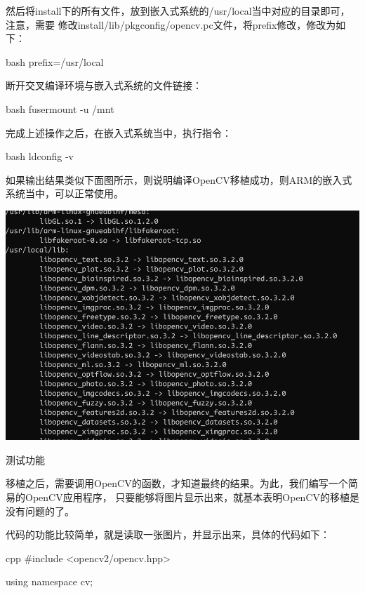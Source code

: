 \begin{outline}[enumerate]
然后将install下的所有文件，放到嵌入式系统的/usr/local当中对应的目录即可，注意，需要
修改install/lib/pkgconfig/opencv.pc文件，将prefix修改，修改为如下：
\begin{code-in-enumerate}{bash}
prefix=/usr/local
\end{code-in-enumerate}

断开交叉编译环境与嵌入式系统的文件链接：
\begin{code-in-enumerate}{bash}
fusermount -u /mnt
\end{code-in-enumerate}

完成上述操作之后，在嵌入式系统当中，执行指令：
\begin{code-in-enumerate}{bash}
ldconfig -v
\end{code-in-enumerate}

如果输出结果类似下面图所示，则说明编译OpenCV移植成功，则ARM的嵌入式系统当中，可以正常使用。
\par\begin{minipage}{\linewidth}
  \centering
  \includegraphics[width=\linewidth]{cross_transplant.png}
  \label{fig:cross_transplant}
\end{minipage}

\1 测试功能

移植之后，需要调用OpenCV的函数，才知道最终的结果。为此，我们编写一个简易的OpenCV应用程序，
只要能够将图片显示出来，就基本表明OpenCV的移植是没有问题的了。

代码的功能比较简单，就是读取一张图片，并显示出来，具体的代码如下：
\begin{code-in-enumerate}{cpp}
#include <opencv2/opencv.hpp>

using namespace cv;


\end{code-in-enumerate}
\end{outline}
